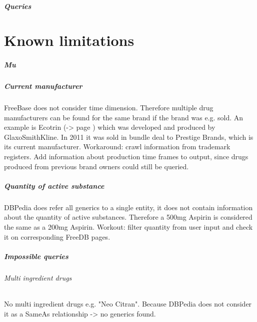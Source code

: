 \documentclass[11pt,titlepage,oneside,openany]{book}
\begin{document}
\paragraph{Queries}
\label{sec:query}



\label{ex:ecotrin}


\chapter{Known limitations}
\label{cha:limiations}


\paragraph{Mu}


\paragraph{Current manufacturer}
FreeBase does not consider time dimension. Therefore multiple drug manufacturers can be found for the same brand if the brand was e.g. sold. An example is Ecotrin (-> page \pageref{ex:ecotrin}) which was developed and produced by GlaxoSmithKline. In 2011 it was sold in bundle deal to Prestige Brands, which is its current manufacturer.
Workaround: crawl information from trademark registers. Add information about production time frames to output, since drugs produced from previous brand owners could still be queried.

\paragraph{Quantity of active substance}
DBPedia does refer all generics to a single entity, it does not contain information about the quantity of active substances. Therefore a 500mg Aspirin is considered the same as a 200mg Aspirin.
Workout: filter quantity from user input and check it on corresponding FreeDB pages.



\paragraph{Impossible queries}
\label{sec:unquery}
\subparagraph{Multi ingredient drugs}No multi ingredient drugs e.g. "Neo Citran". Because DBPedia does not consider it as a SameAs relationship -> no generics found.
\end{document}
